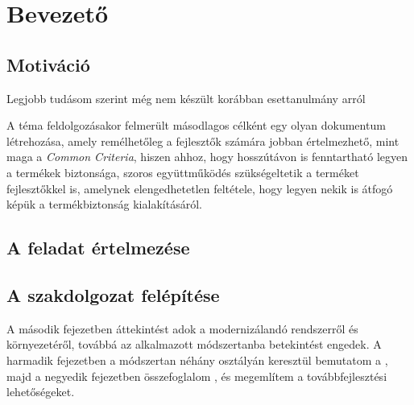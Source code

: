 \chapter{Bevezető}

\section{Motiváció}
Legjobb tudásom szerint még nem készült korábban esettanulmány arról

A téma feldolgozásakor felmerült másodlagos célként egy olyan dokumentum létrehozása, amely
remélhetőleg a fejlesztők számára jobban értelmezhető, mint maga a \emph{Common Criteria}, hiszen
ahhoz, hogy hosszútávon is fenntartható legyen a termékek biztonsága, szoros együttműködés
szükségeltetik a terméket fejlesztőkkel is, amelynek elengedhetetlen feltétele, hogy legyen nekik is
átfogó képük a termékbiztonság kialakításáról.

\section{A feladat értelmezése}

\section{A szakdolgozat felépítése}
A második fejezetben áttekintést adok a modernizálandó rendszerről és környezetéről, továbbá az
alkalmazott módszertanba betekintést engedek.
A harmadik fejezetben a módszertan néhány osztályán keresztül bemutatom a , majd a negyedik
fejezetben összefoglalom , és megemlítem a továbbfejlesztési lehetőségeket.
